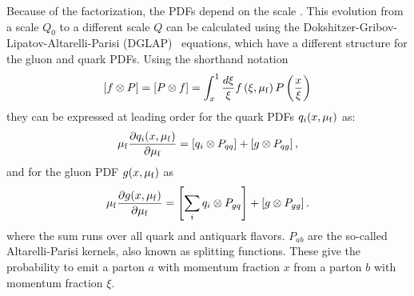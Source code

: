 Because of the factorization, the PDFs depend on the scale \muf. This evolution
from a scale $Q_0$ to a different scale $Q$ can be calculated using the
Dokshitzer-Gribov-Lipatov-Altarelli-Parisi
(DGLAP)~\cite{Gribov:1972ri,Altarelli:1977zs,Dokshitzer:1977sg} equations, which
have a different structure for the gluon and quark PDFs. Using the shorthand notation
%
\begin{equation*}
    \left[f \otimes P \right] = \left[ P \otimes f \right] = \int_x^1 \frac{d
    \xi}{\xi} f\left(\xi, \mu_{\mathrm{f}}\right) P\left( \frac{x}{\xi} \right)
\end{equation*}
%
they can be expressed at leading order for the quark PDFs $q_i(x, \mu_{\mathrm{f}})$ as:
\begin{equation*}
    \mu_{\mathrm{f}} \frac{\partial q_i (x, \mu_{\mathrm{f}})}{\partial \mu_{\mathrm{f}}} = \left[ q_i \otimes P_{qq}
    \right] + \left[ g \otimes P_{qg} \right],
\end{equation*}
%
and for the gluon PDF $g(x, \mu_{\mathrm{f}})$ as
%
\begin{equation*}
    \mu_{\mathrm{f}} \frac{\partial g (x, \mu_{\mathrm{f}})}{\partial \mu_{\mathrm{f}}} = \left[\sum_i  q_i \otimes P_{gq}
    \right] + \left[g \otimes P_{gg}\right].
\end{equation*}
%
where the sum runs over all quark and antiquark flavors. $P_{ab}$ are the
so-called Altarelli-Parisi kernels, also known as splitting functions. These
give the probability to emit a parton $a$ with momentum fraction $x$ from a
parton $b$ with momentum fraction $\xi$.



